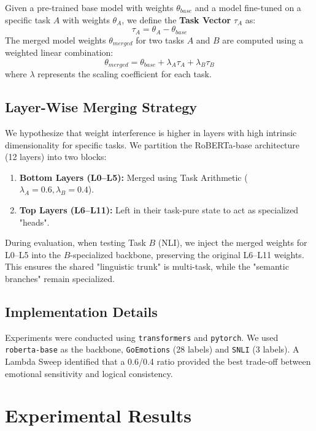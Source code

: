 \documentclass{article}
\begin{document}
Given a pre-trained base model with weights $\theta_{base}$ and a model fine-tuned on a specific task $A$ with weights $\theta_{A}$, we define the \textbf{Task Vector} $\tau_A$ as:
\begin{equation}
\tau_A = \theta_{A} - \theta_{base}
\end{equation}
The merged model weights $\theta_{merged}$ for two tasks $A$ and $B$ are computed using a weighted linear combination:
\begin{equation}
\theta_{merged} = \theta_{base} + \lambda_A \tau_A + \lambda_B \tau_B
\end{equation}
where $\lambda$ represents the scaling coefficient for each task.

\subsection{Layer-Wise Merging Strategy}

We hypothesize that weight interference is higher in layers with high intrinsic dimensionality for specific tasks. We partition the RoBERTa-base architecture (12 layers) into two blocks:
\begin{enumerate}
    \item \textbf{Bottom Layers (L0--L5):} Merged using Task Arithmetic ($\lambda_A=0.6, \lambda_B=0.4$).
    \item \textbf{Top Layers (L6--L11):} Left in their task-pure state to act as specialized "heads".
\end{enumerate}

During evaluation, when testing Task $B$ (NLI), we inject the merged weights for L0--L5 into the $B$-specialized backbone, preserving the original L6--L11 weights. This ensures the shared "linguistic trunk" is multi-task, while the "semantic branches" remain specialized.

\subsection{Implementation Details}

Experiments were conducted using \texttt{transformers} and \texttt{pytorch}. We used \texttt{roberta-base} as the backbone, \texttt{GoEmotions} (28 labels) and \texttt{SNLI} (3 labels). A Lambda Sweep identified that a 0.6/0.4 ratio provided the best trade-off between emotional sensitivity and logical consistency.

\section{Experimental Results}
\label{sec:results}
\end{document}

